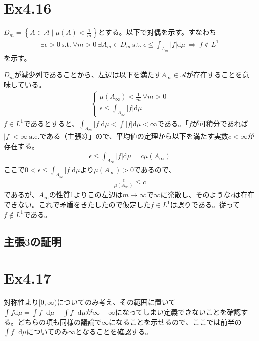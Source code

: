 \documentclass{article}
\begin{document}
\section{Ex4.16}
$D_m = \left\{ A\in \mathcal{A}\mid \mu(A) < \frac{1}{m} \right\}$とする。以下で対偶を示す。すなわち
\begin{align*}
	\exists \epsilon > 0\ \text{s.t.}\ \forall m > 0\ \exists A_m \in D_m\ \text{s.t.}\ \epsilon \leq \int_{A_m} |f| \mathrm{d}\mu\ \Rightarrow\ f\notin L^1
\end{align*}
を示す。

$D_m$が減少列であることから、左辺は以下を満たす$A_{\infty}\in \mathcal{A}$が存在することを意味している。
\begin{align*}
\begin{cases}
	\mu\left( A_{\infty} \right) < \frac{1}{m}\ \forall m > 0\\[8pt]
	\epsilon \leq \int_{A_{\infty}} |f|\mathrm{d} \mu
\end{cases}
\end{align*}
$f\in L^1$であるとすると、$\int_{A_{\infty}} |f|\mathrm{d} \mu < \int |f| \mathrm{d} \mu < \infty$である。「$f$が可積分であれば$|f| < \infty\ \text{a.e.}$である（主張$3$）」ので、平均値の定理から以下を満たす実数$c< \infty$が存在する。
\begin{align*}
	\epsilon \leq \int_{A_{\infty}} |f|\mathrm{d} \mu = c\mu\left( A_{\infty} \right)
\end{align*}
ここで$0 < \epsilon \leq \int_{A_{\infty}} |f|\mathrm{d} \mu$より$\mu\left( A_{\infty} \right)  > 0$であるので、
\begin{align*}
	\frac{\epsilon}{\mu\left( A_{\infty} \right)} \leq c
\end{align*}
であるが、$A_{\infty}$の性質1よりこの左辺は$m \to \infty$で$\infty$に発散し、そのような$c$は存在できない。これで矛盾をきたしたので仮定した$f \in L^1$は誤りである。従って$f \notin L^1$である。

\subsection{主張$3$の証明}

\section{Ex4.17}
対称性より$[0,\infty)$についてのみ考え、その範囲に置いて$\int f \mathrm{d}\mu = \int f^{+} \mathrm{d}\mu - \int f^{-} \mathrm{d}\mu$が$\infty - \infty$になってしまい定義できないことを確認する。どちらの項も同様の議論で$\infty$になることを示せるので、ここでは前半の$\int f^{+} \mathrm{d}\mu$についてのみ$\infty$となることを確認する。
\end{document}
